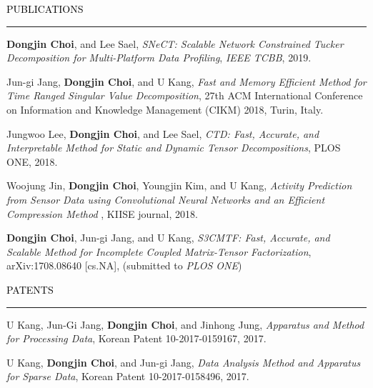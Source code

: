 \documentclass{resume} %
\renewenvironment{rSection}[1]{
	\sectionskip
	\textcolor{Black}{\MakeUppercase{#1}}
	\sectionlineskip
	\hrule
	\begin{list}{}{
			\setlength{\leftmargin}{1.5em}
		}
		\item[]
	}{
	\end{list}
}
\begin{document}
\begin{rSection}{Publications}
\begin{rSubsection}{}{}{}{}
	\vspace*{-2.5mm}
	
	\item \textbf{Dongjin Choi}, and Lee Sael, \textit{SNeCT: Scalable Network Constrained Tucker Decomposition for Multi-Platform Data Profiling}, \textit{IEEE TCBB}, 2019.
	
	\item Jun-gi Jang, \textbf{Dongjin Choi}, and U Kang, \textit{Fast and Memory Efficient Method for Time Ranged Singular Value Decomposition}, 27th ACM International Conference on Information and Knowledge Management (CIKM) 2018, Turin, Italy.
	
	\item Jungwoo Lee, \textbf{Dongjin Choi}, and Lee Sael, \textit{CTD: Fast, Accurate, and Interpretable Method for Static and Dynamic Tensor Decompositions}, PLOS ONE, 2018.
	
	\item Woojung Jin, \textbf{Dongjin Choi}, Youngjin Kim, and U Kang, \textit{Activity Prediction from Sensor Data using Convolutional Neural Networks and an Efficient Compression Method }, KIISE journal, 2018.
	
	\item \textbf{Dongjin Choi}, Jun-gi Jang, and U Kang, \textit{S3CMTF: Fast, Accurate, and Scalable Method for Incomplete Coupled Matrix-Tensor Factorization}, arXiv:1708.08640 [cs.NA], (submitted to \textit{PLOS ONE})
	
\end{rSubsection}

\end{rSection}
\vspace{-3mm}



\begin{rSection}{Patents}
	\begin{rSubsection}{}{}{}{}
		\vspace*{-2.5mm}
		\item U Kang, Jun-Gi Jang, \textbf{Dongjin Choi}, and Jinhong Jung, \textit{Apparatus and Method for Processing Data}, Korean Patent 10-2017-0159167, 2017.
		\item U Kang, \textbf{Dongjin Choi}, and Jun-gi Jang, \textit{Data Analysis Method and Apparatus for Sparse Data}, Korean Patent 10-2017-0158496, 2017.
	\end{rSubsection}
	
\end{rSection}
\vspace{-3mm}
\end{document}
